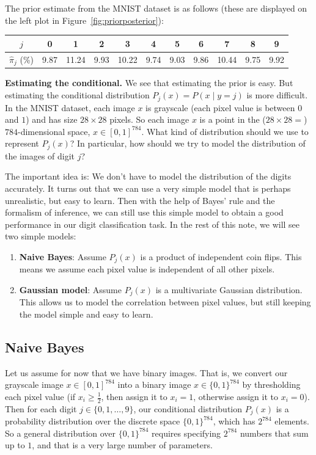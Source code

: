 \documentclass[11pt]{article}
\begin{document}
The prior estimate from the MNIST dataset is as follows (these are displayed on the left plot in Figure~\ref{fig:priorposterior}):
\begin{center}
\begin{tabular}{c | c c c c c c c c c c}
$j$ & 0 & 1 & 2 & 3 & 4 & 5 & 6 & 7 & 8 & 9 \\
\hline
$\hat \pi_j$ (\%) &  9.87 & 11.24 & 9.93 & 10.22 & 9.74 & 9.03 & 9.86 & 10.44 & 9.75 & 9.92
\end{tabular}
\end{center}

\medskip
{\bf Estimating the conditional.}
We see that estimating the prior is easy. But estimating the conditional distribution $P_j(x) = P(x \mid y = j)$ is more difficult. In the MNIST dataset, each image $x$ is grayscale (each pixel value is between $0$ and $1$) and has size $28 \times 28$ pixels. So each image $x$ is a point in the ($28 \times 28 = $) $784$-dimensional space, $x \in [0,1]^{784}$. What kind of distribution should we use to represent $P_j(x)$? In particular, how should we try to model the distribution of the images of digit $j$?

The important idea is: We don't have to model the distribution of the digits accurately. It turns out that we can use a very simple model that is perhaps unrealistic, but easy to learn. Then with the help of Bayes' rule and the formalism of inference, we can still use this simple model to obtain a good performance in our digit classification task. In the rest of this note, we will see two simple models:
\begin{enumerate}
  \item {\bf Naive Bayes}: Assume $P_j(x)$ is a product of independent coin flips. This means we assume each pixel value is independent of all other pixels.
  
  \item {\bf Gaussian model}: Assume $P_j(x)$ is a multivariate Gaussian distribution. This allows us to model the correlation between pixel values, but still keeping the model simple and easy to learn.
\end{enumerate}



\subsection*{Naive Bayes}

Let us assume for now that we have binary images. That is, we convert our grayscale image $x \in [0,1]^{784}$ into a binary image $x \in \{0,1\}^{784}$ by thresholding each pixel value (if $x_i \ge \frac{1}{2}$, then assign it to $x_i = 1$, otherwise assign it to $x_i = 0$). Then for each digit $j \in \{0,1,\dots,9\}$, our conditional distribution $P_j(x)$ is a probability distribution over the discrete space $\{0,1\}^{784}$, which has $2^{784}$ elements. So a general distribution over $\{0,1\}^{784}$ requires specifying $2^{784}$ numbers that sum up to $1$, and that is a very large number of parameters.
\end{document}
